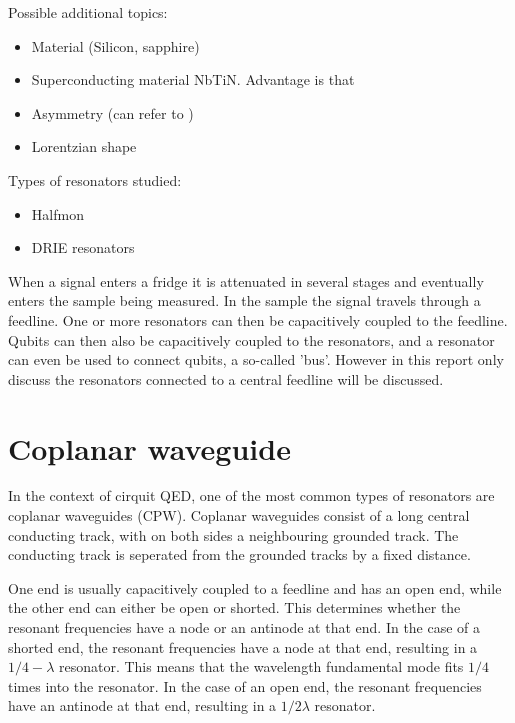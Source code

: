 \documentclass[12pt]{report}
\begin{document}

Possible additional topics:
\begin{itemize}
    \item Material (Silicon, sapphire)
    \item Superconducting material NbTiN. Advantage is that
    \item Asymmetry (can refer to \cite[p.~192]{Geerlings})
    \item Lorentzian shape
\end{itemize}

Types of resonators studied:
\begin{itemize}
    \item Halfmon
    \item DRIE resonators
\end{itemize}


When a signal enters a fridge it is attenuated in several stages and eventually enters the sample being measured. In the sample the signal travels through a feedline. One or more resonators can then be capacitively coupled to the feedline. Qubits can then also be capacitively coupled to the resonators, and a resonator can even be used to connect qubits, a so-called 'bus'. However in this report only discuss the resonators connected to a central feedline will be discussed.









\section{Coplanar waveguide}

In the context of cirquit QED, one of the most common types of resonators are coplanar waveguides (CPW). Coplanar waveguides consist of a long central conducting track, with on both sides a neighbouring grounded track. The conducting track is seperated from the grounded tracks by a fixed distance.

One end is usually capacitively coupled to a feedline and has an open end, while the other end can either be open or shorted. This determines whether the resonant frequencies have a node or an antinode at that end. In the case of a shorted end, the resonant frequencies have a node at that end, resulting in a  $1/4 - \lambda$ resonator. This means that the wavelength fundamental mode fits $1/4$ times into the resonator. In the case of an open end, the resonant frequencies have an antinode at that end, resulting in a $1/2 \lambda$ resonator.
\end{document}
